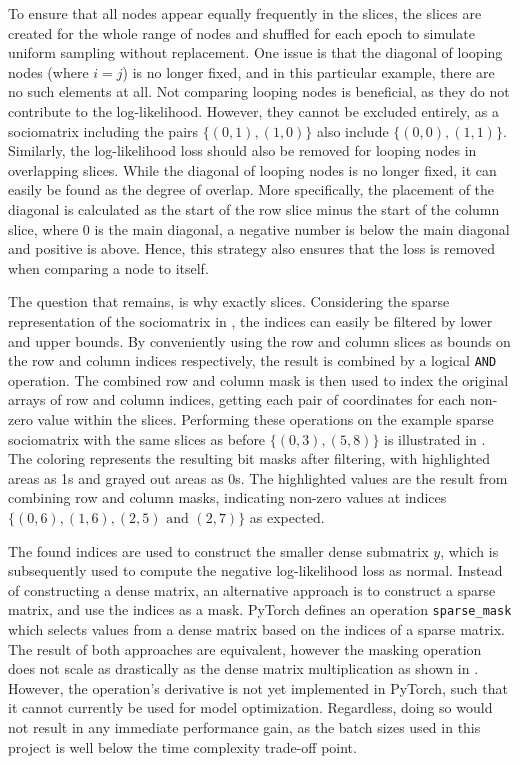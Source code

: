         To ensure that all nodes appear equally frequently in the slices, the slices are created for the whole range of nodes and shuffled for each epoch to simulate uniform sampling without replacement.
        One issue is that the diagonal of looping nodes (where $i=j$) is no longer fixed, and in this particular example, there are no such elements at all. Not comparing looping nodes is beneficial, as they do not contribute to the log-likelihood. However, they cannot be excluded entirely, as a sociomatrix including the pairs $\{(0,1), (1,0)\}$ also include $\{(0,0), (1,1)\}$. Similarly, the log-likelihood loss should also be removed for looping nodes in overlapping slices.
        While the diagonal of looping nodes is no longer fixed, it can easily be found as the degree of overlap. More specifically, the placement of the diagonal is calculated as the start of the row slice minus the start of the column slice, where 0 is the main diagonal, a negative number is below the main diagonal and positive is above. Hence, this strategy also ensures that the loss is removed when comparing a node to itself.
        
        The question that remains, is why exactly slices. Considering the sparse representation of the sociomatrix in , the indices can easily be filtered by lower and upper bounds. By conveniently using the row and column slices as bounds on the row and column indices respectively, the result is combined by a logical \texttt{AND} operation. The combined row and column mask is then used to index the original arrays of row and column indices, getting each pair of coordinates for each non-zero value within the slices. Performing these operations on the example sparse sociomatrix with the same slices as before $\{(0,3), (5,8)\}$ is illustrated in . The coloring represents the resulting bit masks after filtering, with highlighted areas as 1s and grayed out areas as 0s. The highlighted values are the result from combining row and column masks, indicating non-zero values at indices $\{(0,6),(1,6),(2,5) \text{ and } (2,7)\}$ as expected.
        
        The found indices are used to construct the smaller dense submatrix $y$, which is subsequently used to compute the negative log-likelihood loss as normal.
        Instead of constructing a dense matrix, an alternative approach is to construct a sparse matrix, and use the indices as a mask. PyTorch defines an operation \texttt{sparse\_mask} which selects values from a dense matrix based on the indices of a sparse matrix. The result of both approaches are equivalent, however the masking operation does not scale as drastically as the dense matrix multiplication as shown in .
        However, the operation's derivative is not yet implemented in PyTorch, such that it cannot currently be used for model optimization. Regardless, doing so would not result in any immediate performance gain, as the batch sizes used in this project is well below the time complexity trade-off point.
        
        